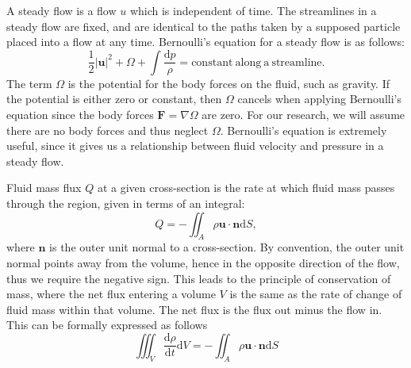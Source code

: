 \documentclass{report}
\begin{document}
A steady flow is a flow $u$ which is independent of time.
The streamlines in a steady flow are fixed, and are identical to the paths taken by a supposed particle placed into a flow at any time.
Bernoulli's equation for a steady flow is as follows:
\begin{equation}
    \frac{1}{2}|\mathbf{u}|^2 + \Omega + \int\frac{\mathrm{d}p}{\rho} = \mathrm{constant~along~a~streamline}.
\end{equation}
The term $\Omega$ is the potential for the body forces on the fluid, such as gravity.
If the potential is either zero or constant,
then $\Omega$ cancels when applying Bernoulli's equation since the body forces $\mathbf{F} = \nabla \Omega$ are zero. %
For our research, we will assume there are no body forces and thus neglect $\Omega$.
Bernoulli's equation is extremely useful, since it gives us a relationship between fluid velocity and pressure in a steady flow.

Fluid mass flux $Q$ at a given cross-section is the rate at which fluid mass passes through the region,
given in terms of an integral:
\begin{equation*}
    Q = -\iint_A \rho \mathbf{u} \cdot \mathbf{n} \mathrm{d}S,
\end{equation*}
where $\mathbf{n}$ is the outer unit normal to a cross-section.
By convention, the outer unit normal points away from the volume,
hence in the opposite direction of the flow, thus we require the negative sign.
This leads to the principle of conservation of mass, where the net flux entering a volume $V$ is the same as the rate of change of fluid mass within that volume.
The net flux is the flux out minus the flow in.
This can be formally expressed as follows
\begin{equation*}
    \iiint_V \frac{\mathrm{d}\rho}{\mathrm{d}t} \mathrm{d}V = - \iint_A \rho \mathbf{u} \cdot \mathbf{n} \mathrm{d}S 
\end{equation*} 
\end{document}
